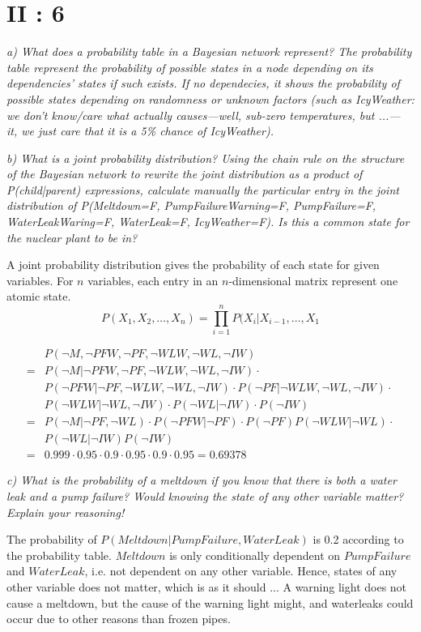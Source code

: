 \section {II : 6}
\em a) What does a probability table in a Bayesian network represent?\em
 The probability table represent the probability of possible states in a node depending on its dependencies' states if such exists. If no dependecies, it shows the probability of possible states depending on randomness or unknown factors (such as IcyWeather: we don't know/care what actually causes---well, sub-zero temperatures, but ...--- it, we just care that it is a 5\% chance of IcyWeather).

\em b) What is a joint probability distribution? Using the chain rule on the structure of the Bayesian network to rewrite the joint distribution as a product of P(child|parent) expressions, calculate manually the particular entry in the joint distribution of P(Meltdown=F, PumpFailureWarning=F, PumpFailure=F, WaterLeakWaring=F, WaterLeak=F, IcyWeather=F). Is this a common state for the nuclear plant to be in?\em

A joint probability distribution gives the probability of each state for given variables. For $n$ variables, each entry in an $n$-dimensional matrix represent one atomic state.
$$  P(X_1,X_2,\dots,X_n) = \prod_{i=1}^{n} P(X_i|X_{i-1},\dots,X_1 $$

\begin{align*}
  & P(\neg M, \neg PFW, \neg PF, \neg WLW, \neg WL, \neg IW) \\
  = & P(\neg M|\neg PFW, \neg PF, \neg WLW, \neg WL, \neg IW)\cdot\\
  & P(\neg PFW | \neg PF, \neg WLW, \neg WL, \neg IW)\cdot P(\neg PF | \neg WLW, \neg WL, \neg IW)\cdot\\
  & P(\neg WLW | \neg WL, \neg IW)\cdot P(\neg WL | \neg IW)\cdot P(\neg IW)\\
  = & P(\neg M | \neg PF, \neg WL)\cdot P(\neg PFW | \neg PF)\cdot P(\neg PF)P(\neg WLW | \neg WL)\cdot
  \\ & P(\neg WL | \neg IW)P(\neg IW)\\
  = & 0.999\cdot0.95\cdot0.9\cdot0.95\cdot0.9\cdot0.95 = 0.69378
\end{align*}

\em c) What is the probability of a meltdown if you know that there is both a water leak and a pump failure? Would knowing the state of any other variable matter? Explain your reasoning!\em

The probability of $P(Meltdown|PumpFailure, WaterLeak)$ is 0.2 according to the probability table. $Meltdown$ is only conditionally dependent on $PumpFailure$ and $WaterLeak$, i.e. not dependent on any other variable. Hence, states of any other variable does not matter, which is as it should ... A warning light does not cause a meltdown, but the cause of the warning light might, and waterleaks could occur due to other reasons than frozen pipes.

